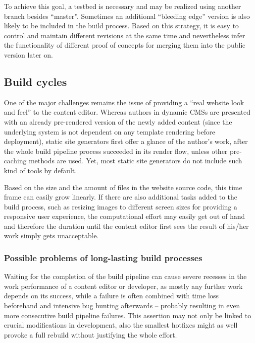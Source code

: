 To achieve this goal, a testbed is necessary and may be realized using another branch besides ``master''. Sometimes an additional ``bleeding edge'' version is also likely to be included in the build process. Based on this strategy, it is easy to control and maintain different revisions at the same time and nevertheless infer the functionality of different proof of concepts for merging them into the public version later on.


\subsection{Build cycles}
\label{sec:challenges-buildcyclecompletion}

One of the major challenges remains the issue of providing a ``real website look and feel'' to the content editor. Whereas authors in dynamic CMSs are presented with an already pre-rendered version of the newly added content (since the underlying system is not dependent on any template rendering before deployment), static site generators first offer a glance of the author's work, after the whole build pipeline process succeeded in its render flow, unless other pre-caching methods are used. Yet, most static site generators do not include such kind of tools by default.

Based on the size and the amount of files in the website source code, this time frame can easily grow linearly. If there are also additional tasks added to the build process, such as resizing images to different screen sizes for providing a  responsive user experience, the computational effort may easily get out of hand and therefore the duration until the content editor first sees the result of his/her work simply gets unacceptable.

\subsubsection{Possible problems of long-lasting build processes}
Waiting for the completion of the build pipeline can cause severe recesses in the work performance of a content editor or developer, as mostly any further work depends on its success, while a failure is often combined with time loss beforehand and intensive bug hunting afterwards -- probably resulting in even more consecutive build pipeline failures. This assertion may not only be linked to crucial modifications in development, also the smallest hotfixes might as well provoke a full rebuild without justifying the whole effort.

